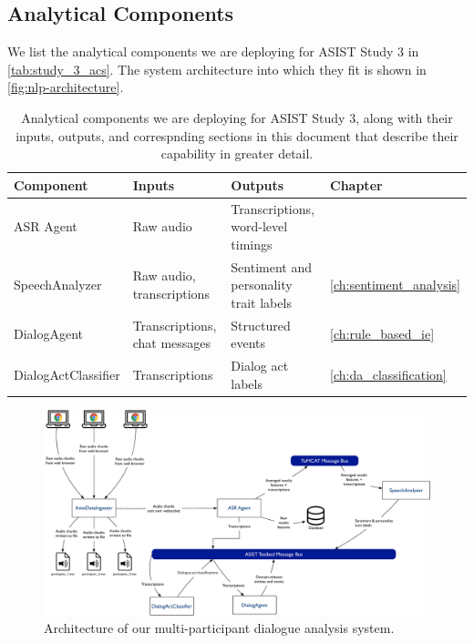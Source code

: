 \subsection{Analytical Components}

We list the analytical components we are deploying for ASIST Study 3 in
\autoref{tab:study_3_acs}. The system architecture into which they fit is shown
in \autoref{fig:nlp-architecture}.

\begin{table}
    \small
    \begin{tabularx}{5.5in}{llXl}
        \toprule
        Component           & Inputs                        & Outputs                                & Chapter\\\midrule
        ASR Agent           & Raw audio                     & Transcriptions, word-level timings     & \\
        SpeechAnalyzer      & Raw audio, transcriptions     & Sentiment and personality trait labels & \autoref{ch:sentiment_analysis}\\
        DialogAgent         & Transcriptions, chat messages & Structured events                      & \autoref{ch:rule_based_ie}\\
        DialogActClassifier & Transcriptions                & Dialog act labels                      & \autoref{ch:da_classification}\\
        \bottomrule
    \end{tabularx}
    \caption{%
        Analytical components we are deploying for ASIST Study 3, along with
        their inputs, outputs, and correspnding sections in this document that
        describe their capability in greater detail.
    }
    \label{tab:study_3_acs}
\end{table}


\begin{figure}
    \centering
    \includegraphics[width=6in]{images/nlp_architecture}
    \caption{Architecture of our multi-participant dialogue analysis system.}
    \label{fig:nlp-architecture}
\end{figure}

